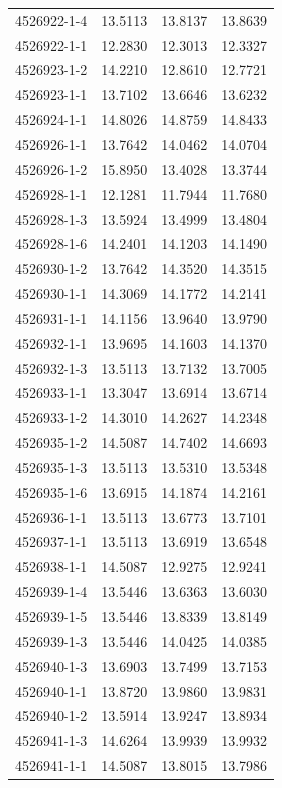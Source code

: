 \begin{longtable}{lrrr}
4526922-1-4 & 13.5113 & 13.8137 & 13.8639 \\
4526922-1-1 & 12.2830 & 12.3013 & 12.3327 \\
4526923-1-2 & 14.2210 & 12.8610 & 12.7721 \\
4526923-1-1 & 13.7102 & 13.6646 & 13.6232 \\
4526924-1-1 & 14.8026 & 14.8759 & 14.8433 \\
4526926-1-1 & 13.7642 & 14.0462 & 14.0704 \\
4526926-1-2 & 15.8950 & 13.4028 & 13.3744 \\
4526928-1-1 & 12.1281 & 11.7944 & 11.7680 \\
4526928-1-3 & 13.5924 & 13.4999 & 13.4804 \\
4526928-1-6 & 14.2401 & 14.1203 & 14.1490 \\
4526930-1-2 & 13.7642 & 14.3520 & 14.3515 \\
4526930-1-1 & 14.3069 & 14.1772 & 14.2141 \\
4526931-1-1 & 14.1156 & 13.9640 & 13.9790 \\
4526932-1-1 & 13.9695 & 14.1603 & 14.1370 \\
4526932-1-3 & 13.5113 & 13.7132 & 13.7005 \\
4526933-1-1 & 13.3047 & 13.6914 & 13.6714 \\
4526933-1-2 & 14.3010 & 14.2627 & 14.2348 \\
4526935-1-2 & 14.5087 & 14.7402 & 14.6693 \\
4526935-1-3 & 13.5113 & 13.5310 & 13.5348 \\
4526935-1-6 & 13.6915 & 14.1874 & 14.2161 \\
4526936-1-1 & 13.5113 & 13.6773 & 13.7101 \\
4526937-1-1 & 13.5113 & 13.6919 & 13.6548 \\
4526938-1-1 & 14.5087 & 12.9275 & 12.9241 \\
4526939-1-4 & 13.5446 & 13.6363 & 13.6030 \\
4526939-1-5 & 13.5446 & 13.8339 & 13.8149 \\
4526939-1-3 & 13.5446 & 14.0425 & 14.0385 \\
4526940-1-3 & 13.6903 & 13.7499 & 13.7153 \\
4526940-1-1 & 13.8720 & 13.9860 & 13.9831 \\
4526940-1-2 & 13.5914 & 13.9247 & 13.8934 \\
4526941-1-3 & 14.6264 & 13.9939 & 13.9932 \\
4526941-1-1 & 14.5087 & 13.8015 & 13.7986 \\

\end{longtable}
